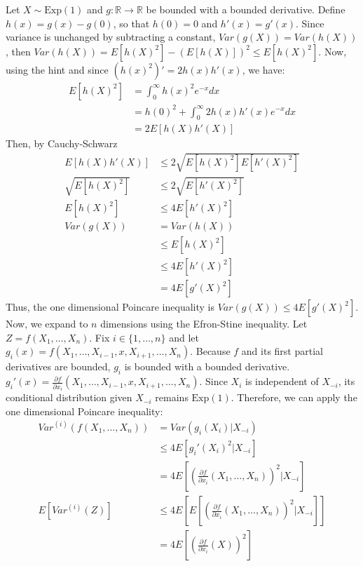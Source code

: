 \documentclass[11pt,a4paper,margin=1in]{article}
\begin{document}
\section{}
Let $X \sim \text{Exp}(1)$ and $g : \mathbb{R} \to \mathbb{R}$ be bounded with
a bounded derivative. Define $h(x) = g(x) - g(0)$, so that $h(0) = 0$ and $h'(x) = g'(x)$.
Since variance is unchanged by subtracting a constant, $Var(g(X)) = Var(h(X))$,
then $Var(h(X)) = E[h(X)^2] - (E[h(X)])^2 \leq E[h(X)^2]$. Now, using the hint
and since $(h(x)^2)' = 2h(x)h'(x)$, we have:
\begin{align*}
    E[h(X)^2] &= \int_0^\infty h(x)^2 e^{-x} dx \\
    &= h(0)^2 + \int_0^\infty 2h(x)h'(x) e^{-x} dx \\
    &= 2E[h(X)h'(X)]
\end{align*}
Then, by Cauchy-Schwarz
\begin{align*}
    E[h(X)h'(X)] &\leq 2\sqrt{E[h(X)^2]E[h'(X)^2]} \\
    \sqrt{E[h(X)^2]} &\leq 2\sqrt{E[h'(X)^2]} \\
    E[h(X)^2] &\leq 4E[h'(X)^2] \\
    Var(g(X)) &= Var(h(X)) \\ 
    &\leq E[h(X)^2] \\
    &\leq 4E[h'(X)^2] \\
    &= 4E[g'(X)^2]
\end{align*}
Thus, the one dimensional Poincare inequality is $Var(g(X)) \leq 4E[g'(X)^2]$.
Now, we expand to $n$ dimensions using the Efron-Stine inequality. Let $Z = f(X_1, \ldots, X_n)$. 
Fix $i \in \{1, \ldots, n\}$ and let $g_i(x) = f(X_1, \ldots, X_{i - 1}, x, X_{i + 1}, \ldots, X_n)$. Because
$f$ and its first partial derivatives are bounded, $g_i$ is bounded with a bounded derivative.
$g_i'(x) = \frac{\partial f}{\partial x_i}(X_1, \ldots, X_{i - 1}, x, X_{i + 1}, \ldots, X_n)$.
Since $X_i$ is independent of $X_{-i}$, its conditional distribution given $X_{-i}$
remains $\text{Exp}(1)$. Therefore, we can apply the one dimensional Poincare inequality:
\begin{align*}
    Var^{(i)}(f(X_1, \ldots, X_n)) &= Var(g_i(X_i) | X_{-i}) \\
    &\leq 4E[g_i'(X_i)^2 | X_{-i}] \\
    &= 4E\left[\left(\frac{\partial f}{\partial x_i}(X_1, \ldots, X_n)\right)^2 | X_{-i}\right] \\
    E[Var^{(i)}(Z)] &\leq 4E\left[E\left[\left(\frac{\partial f}{\partial x_i}(X_1, \ldots, X_n)\right)^2 | X_{-i}\right]\right] \\
    &= 4E\left[\left(\frac{\partial f}{\partial x_i}(X)\right)^2\right]
\end{align*}
\end{document}

